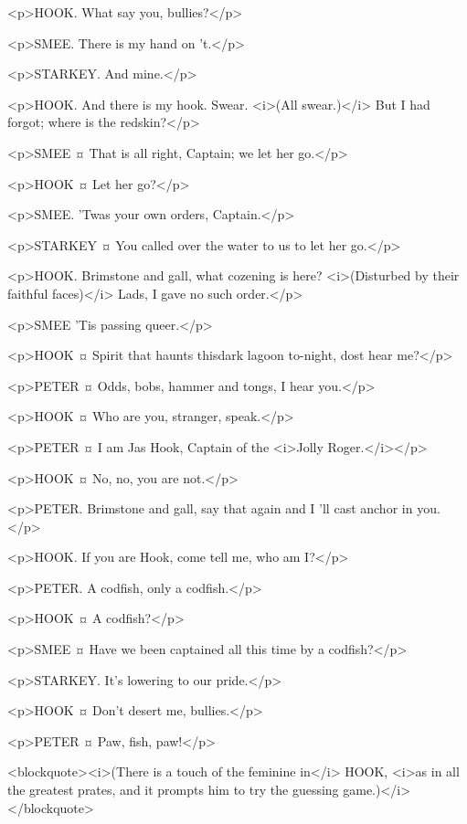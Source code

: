 <p>HOOK. What say you, bullies?</p>

<p>SMEE. There is my hand on 't.</p>

<p>STARKEY. And mine.</p>

<p>HOOK. And there is my hook. Swear. <i>(All swear.)</i> But I had forgot; where is the redskin?</p>

<p>SMEE ¤
That is all right, Captain; we let her go.</p>

<p>HOOK ¤
Let her go?</p>

<p>SMEE. 'Twas your own orders, Captain.</p>

<p>STARKEY ¤
You called over the water to us to let her go.</p>

<p>HOOK. Brimstone and gall, what cozening is here? <i>(Disturbed by their faithful faces)</i> Lads, I gave no such order.</p>

<p>SMEE 'Tis passing queer.</p>

<p>HOOK ¤
Spirit that haunts thisdark lagoon to-night, dost hear me?</p>

<p>PETER ¤
Odds, bobs, hammer and tongs, I hear you.</p>

<p>HOOK ¤
Who are you, stranger, speak.</p>

<p>PETER ¤
I am Jas Hook, Captain of the <i>Jolly Roger.</i></p>

<p>HOOK ¤
No, no, you are not.</p>

<p>PETER. Brimstone and gall, say that again and I 'll cast anchor in you.</p>

<p>HOOK. If you are Hook, come tell me, who am I?</p>

<p>PETER. A codfish, only a codfish.</p>

<p>HOOK ¤
A codfish?</p>

<p>SMEE ¤
Have we been captained all this time by a codfish?</p>

<p>STARKEY. It's lowering to our pride.</p>

<p>HOOK ¤
Don't desert me, bullies.</p>

<p>PETER ¤
Paw, fish, paw!</p>

<blockquote><i>(There is a touch of the feminine in</i> HOOK, <i>as in all the greatest prates, and it prompts him to try the guessing game.)</i></blockquote>

